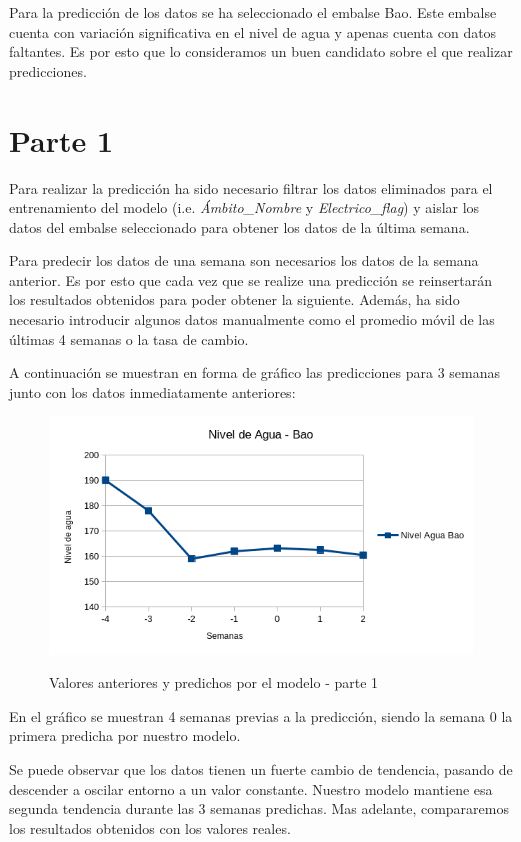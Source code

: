\documentclass[12pt]{report} %
\begin{document}
Para la predicción de los datos se ha seleccionado el embalse Bao. Este embalse cuenta con variación significativa en el nivel de agua y apenas cuenta con datos faltantes. Es por esto que lo consideramos un buen candidato sobre el que realizar predicciones.

\section{Parte 1}
Para realizar la predicción ha sido necesario filtrar los datos eliminados para el entrenamiento del modelo (i.e. \textit{Ámbito\_Nombre} y \textit{Electrico\_flag}) y aislar los datos del embalse seleccionado para obtener los datos de la última semana.

Para predecir los datos de una semana son necesarios los datos de la semana anterior. Es por esto que cada vez que se realize una predicción se reinsertarán los resultados obtenidos para poder obtener la siguiente. Además, ha sido necesario introducir algunos datos manualmente como el promedio móvil de las últimas 4 semanas o la tasa de cambio.

A continuación se muestran en forma de gráfico las predicciones para 3 semanas junto con los datos inmediatamente anteriores:

\begin{figure}[H]
    \includegraphics[width=0.85\linewidth]{predict-1-bao.png}\\
    \caption{\small Valores anteriores y  predichos por el modelo - parte 1}
\end{figure}
En el gráfico se muestran 4 semanas previas a la predicción, siendo la semana 0 la primera predicha por nuestro modelo.

Se puede observar que los datos tienen un fuerte cambio de tendencia, pasando de descender a oscilar entorno a un valor constante. Nuestro modelo mantiene esa segunda tendencia durante las 3 semanas predichas. Mas adelante, compararemos los resultados obtenidos con los valores reales.
\end{document}
